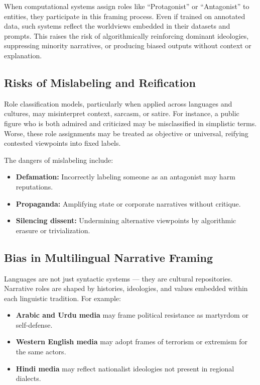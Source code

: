 \documentclass[12pt]{article}
\begin{document}
When computational systems assign roles like “Protagonist” or “Antagonist” to entities, they participate in this framing process. Even if trained on annotated data, such systems reflect the worldviews embedded in their datasets and prompts. This raises the risk of algorithmically reinforcing dominant ideologies, suppressing minority narratives, or producing biased outputs without context or explanation.

\subsection{Risks of Mislabeling and Reification}

Role classification models, particularly when applied across languages and cultures, may misinterpret context, sarcasm, or satire. For instance, a public figure who is both admired and criticized may be misclassified in simplistic terms. Worse, these role assignments may be treated as objective or universal, reifying contested viewpoints into fixed labels.

The dangers of mislabeling include:
\begin{itemize}
    \item \textbf{Defamation:} Incorrectly labeling someone as an antagonist may harm reputations.
    \item \textbf{Propaganda:} Amplifying state or corporate narratives without critique.
    \item \textbf{Silencing dissent:} Undermining alternative viewpoints by algorithmic erasure or trivialization.
\end{itemize}

\subsection{Bias in Multilingual Narrative Framing}

Languages are not just syntactic systems — they are cultural repositories. Narrative roles are shaped by histories, ideologies, and values embedded within each linguistic tradition. For example:
\begin{itemize}
    \item \textbf{Arabic and Urdu media} may frame political resistance as martyrdom or self-defense.
    \item \textbf{Western English media} may adopt frames of terrorism or extremism for the same actors.
    \item \textbf{Hindi media} may reflect nationalist ideologies not present in regional dialects.
\end{itemize}
\end{document}
